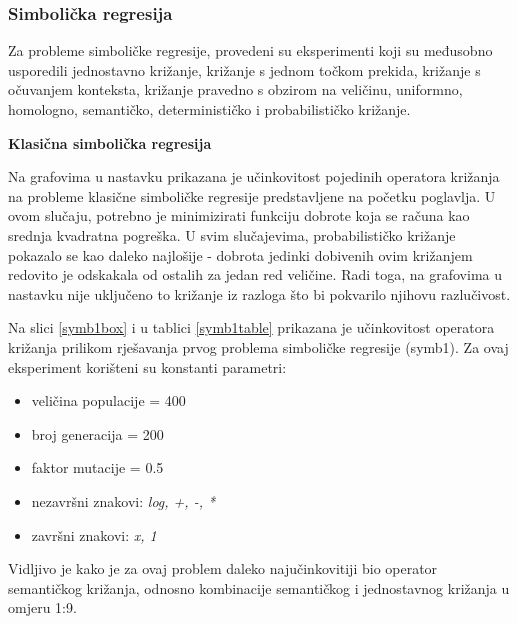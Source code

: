 \subsubsection{Simbolička regresija}

Za probleme simboličke regresije, provedeni su eksperimenti koji su međusobno usporedili jednostavno križanje, križanje s jednom točkom prekida, križanje s očuvanjem konteksta, križanje pravedno s obzirom na veličinu, uniformno, homologno, semantičko, determinističko i probabilističko križanje.

\textbf{Klasična simbolička regresija}


Na grafovima u nastavku prikazana je učinkovitost pojedinih operatora križanja na probleme klasične simboličke regresije predstavljene na početku poglavlja. U ovom slučaju, potrebno je minimizirati funkciju dobrote koja se računa kao srednja kvadratna pogreška. U svim slučajevima, probabilističko križanje pokazalo se kao daleko najlošije - dobrota jedinki dobivenih ovim križanjem redovito je odskakala od ostalih za jedan red veličine. Radi toga, na grafovima u nastavku nije uključeno to križanje iz razloga što bi pokvarilo njihovu razlučivost.

Na slici \ref{symb1box} i u tablici \ref{symb1table} prikazana je učinkovitost operatora križanja prilikom rješavanja prvog problema simboličke regresije (symb1). Za ovaj eksperiment korišteni su konstanti parametri:
\begin{itemize}
\item{veličina populacije = 400}
\item{broj generacija = 200}
\item{faktor mutacije = 0.5}
\item{nezavršni znakovi: \textit{log, +, -, *}}
\item{završni znakovi: \textit{x, 1}}
\end{itemize}

Vidljivo je kako je za ovaj problem daleko najučinkovitiji bio operator semantičkog križanja, odnosno kombinacije semantičkog i jednostavnog križanja u omjeru 1:9. 



